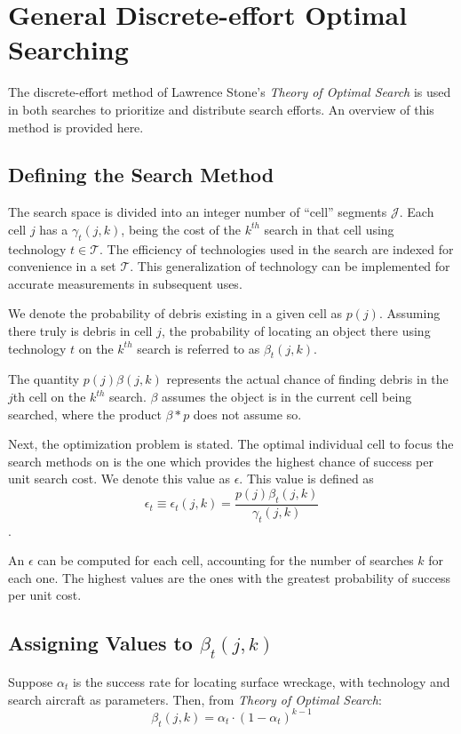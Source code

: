 \documentclass[a4paper]{article}
\begin{document}
\section{General Discrete-effort Optimal Searching}

The discrete-effort method of Lawrence Stone's \textit{Theory of Optimal Search} is used in both searches to prioritize and distribute search efforts. An overview of this method is provided here. 

\subsection{Defining the Search Method}

The search space is divided into an integer number of ``cell'' segments $\mathcal{J}$. Each cell $j$ has a $\gamma_t(j,k)$, being the cost of the $k^{th}$ search in that cell using technology $t\in\mathcal{T}$. The efficiency of technologies used in the search are indexed for convenience in a set $\mathcal{T}$. This generalization of technology can be implemented for accurate measurements in subsequent uses. 


We denote the probability of debris existing in a given cell as $p(j)$. Assuming there truly is debris in cell $j$, the probability of locating an object there using technology $t$ on the $k^{th}$ search is referred to as $\beta_t(j,k)$.

The quantity $p(j)\beta(j,k)$ represents the actual chance of finding debris in the $j$th cell on the $k^{th}$ search. $\beta$ assumes the object is in the current cell being searched, where the product $\beta * p$ does not assume so.

Next, the optimization problem is stated. The optimal individual cell to focus the search methods on is the one which provides the highest chance of success per unit search cost. We denote this value as $\epsilon$. This value is defined as $$\epsilon_t\equiv\epsilon_t(j,k)=\frac{p(j)\beta_t(j,k)}{\gamma_t(j,k)}$$. 

An $\epsilon$ can be computed for each cell, accounting for the number of searches $k$ for each one. The highest values are the ones with the greatest probability of success per unit cost. 

\subsection{Assigning Values to $\beta_t(j,k)$}

Suppose $\alpha_t$ is the success rate for locating surface wreckage, with technology and search aircraft as parameters. Then, from \textit{Theory of Optimal Search}: \[\beta_t(j,k)=\alpha_t\cdot(1-\alpha_t)^{k-1}\]
\end{document}
